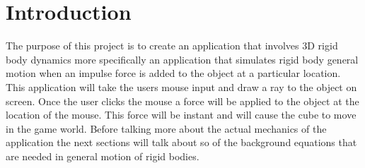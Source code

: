 \section{Introduction}\label{sc:Intro}
The purpose of this project is to create an application that involves 3D rigid body dynamics more specifically an application that simulates rigid body general motion when an impulse force is added to the object at a particular location.
This application will take the users mouse input and draw a ray to the object on screen.
Once the user clicks the mouse a force will be applied to the object at the location of the mouse.
This force will be instant and will cause the cube to move in the game world.
Before talking more about the actual mechanics of the application the next sections will talk about so of the background equations that are needed in general motion of rigid bodies.